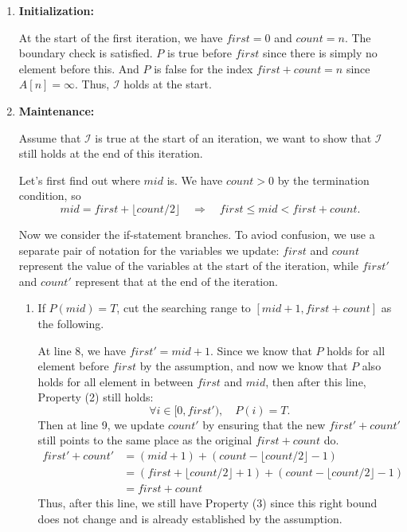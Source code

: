 \documentclass[12pt]{article}
\begin{document}
\begin{enumerate}
    \item \textbf{Initialization:}

    At the start of the first iteration, we have \(first = 0\) and \(count = n\). The boundary check is satisfied. \(P\) is true before \(first\) since there is simply no element before this. And \(P\) is false for the index \(first + count = n\) since \(A[n] = \infty\). Thus, \(\mathcal{I}\) holds at the start.

    \item \textbf{Maintenance:}

    Assume that \(\mathcal{I}\) is true at the start of an iteration, we want to show that \(\mathcal{I}\) still holds at the end of this iteration.

    Let's first find out where \(mid\) is. We have \(count > 0\) by the termination condition, so
    \[
        mid = first + \lfloor count / 2 \rfloor \quad \Rightarrow \quad first \leq mid < first + count.
    \]

    Now we consider the if-statement branches. To aviod confusion, we use a separate pair of notation for the variables we update: \(first\) and \(count\) represent the value of the variables at the start of the iteration, while \(first'\) and \(count'\) represent that at the end of the iteration.
    \begin{enumerate}
        \item If \(P(mid) = T\), cut the searching range to \([mid + 1, first + count]\) as the following.

        At line 8, we have \(first' = mid + 1\). Since we know that \(P\) holds for all element before \(first\) by the assumption, and now we know that \(P\) also holds for all element in between \(first\) and \(mid\), then after this line, Property (2) still holds:
        \[
            \forall i \in [0, first'), \quad P(i) = T.
        \]
        Then at line 9, we update \(count'\) by ensuring that the new \(first' + count'\) still points to the same place as the original \(first + count\) do.
        \begin{align*}
            first' + count' & = (mid + 1) + (count - \lfloor count / 2 \rfloor - 1) \\
            & = (first + \lfloor count / 2 \rfloor + 1) + (count - \lfloor count / 2 \rfloor - 1) \\
            & = first + count
        \end{align*}
        Thus, after this line, we still have Property (3) since this right bound does not change and is already established by the assumption.


\end{enumerate}
\end{enumerate}
\end{document}

